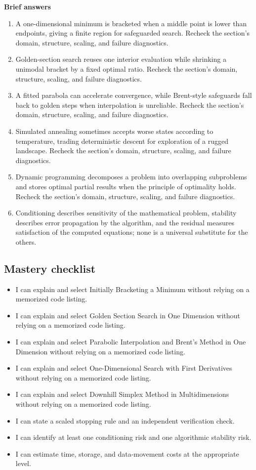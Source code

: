 \documentclass[10pt,letterpaper]{article}
\begin{document}
\textbf{Brief answers}
\begin{enumerate}
\item A one-dimensional minimum is bracketed when a middle point is lower than endpoints, giving a finite region for safeguarded search. Recheck the section's domain, structure, scaling, and failure diagnostics.
\item Golden-section search reuses one interior evaluation while shrinking a unimodal bracket by a fixed optimal ratio. Recheck the section's domain, structure, scaling, and failure diagnostics.
\item A fitted parabola can accelerate convergence, while Brent-style safeguards fall back to golden steps when interpolation is unreliable. Recheck the section's domain, structure, scaling, and failure diagnostics.
\item Simulated annealing sometimes accepts worse states according to temperature, trading deterministic descent for exploration of a rugged landscape. Recheck the section's domain, structure, scaling, and failure diagnostics.
\item Dynamic programming decomposes a problem into overlapping subproblems and stores optimal partial results when the principle of optimality holds. Recheck the section's domain, structure, scaling, and failure diagnostics.
\item Conditioning describes sensitivity of the mathematical problem, stability describes error propagation by the algorithm, and the residual measures satisfaction of the computed equations; none is a universal substitute for the others.
\end{enumerate}

\subsection*{Mastery checklist}
\begin{itemize}
\item[$\square$] I can explain and select Initially Bracketing a Minimum without relying on a memorized code listing.
\item[$\square$] I can explain and select Golden Section Search in One Dimension without relying on a memorized code listing.
\item[$\square$] I can explain and select Parabolic Interpolation and Brent's Method in One Dimension without relying on a memorized code listing.
\item[$\square$] I can explain and select One-Dimensional Search with First Derivatives without relying on a memorized code listing.
\item[$\square$] I can explain and select Downhill Simplex Method in Multidimensions without relying on a memorized code listing.
\item[$\square$] I can state a scaled stopping rule and an independent verification check.
\item[$\square$] I can identify at least one conditioning risk and one algorithmic stability risk.
\item[$\square$] I can estimate time, storage, and data-movement costs at the appropriate level.
\end{itemize}
\end{document}
